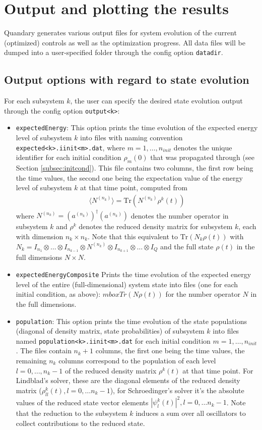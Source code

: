 \documentclass[11pt]{article}
\begin{document}
\section{Output and plotting the results}
Quandary generates various output files for system evolution of the current (optimized) controls as well as the optimization progress. All data files will be dumped into a user-specified folder through the config option \texttt{datadir}. 

\subsection{Output options with regard to state evolution}
For each subsystem $k$, the user can specify the desired state evolution output through the config option \texttt{output<k>}:
\begin{itemize}
  \item \texttt{expectedEnergy}: This option prints the time evolution of the expected energy level of subsystem $k$ into files with naming convention \texttt{expected<k>.iinit<m>.dat}, where $m=1,\dots,n_{init}$ denotes the unique identifier for each initial condition $\rho_m(0)$ that was propagated through (see Section \ref{subsec:initcond}). This file contains two columns, the first row being the time values, the second one being the expectation value of the energy level of subsystem $k$ at that time point, computed from 
  \begin{align}
    \langle N^{(n_k)}\rangle = \mbox{Tr}\left(N^{(n_k)} \rho^k(t)\right)
  \end{align}
  where $N^{(n_k)} = \left(a^{(n_k)}\right)^\dagger \left(a^{(n_k)}\right)$ denotes the number operator in subsystem $k$ and $\rho^k$ denotes the reduced density matrix for subsystem $k$, each with dimension $n_k\times n_k$. Note that this equivalent to $\mbox{Tr}\left(N_k \rho(t)\right)$ with $N_k = I_{n_1} \otimes \dots \otimes I_{n_{k-1}} \otimes N^{(n_k)} \otimes I_{n_{k+1}}\otimes \dots \otimes I_Q$ and the full state $\rho(t)$ in the full dimensions $N\times N$.
  \item \texttt{expectedEnergyComposite} Prints the time evolution of the expected energy level of the entire (full-dimensional) system state into files (one for each initial condition, as above): $mbox{Tr}\left(N \rho(t)\right)$ for the number operator $N$ in the full dimensions. 
  \item \texttt{population}: This option prints the time evolution of the state populations (diagonal of density matrix, state probabilities) of subsystem $k$ into files named \texttt{population<k>.iinit<m>.dat} for each initial condition $m=1,\dots, n_{init}$. The files contain $n_k+1$ columns, the first one being the time values, the remaining $n_k$ columns correspond to the population of each level $l=0,\dots,n_k-1$ of the reduced density matrix $\rho^k(t)$ at that time point. For Lindblad's solver, these are the diagonal elements of the reduced density matrix ($\rho_{ll}^k(t), l=0,\dots n_k-1$), for Schroedinger's solver it's the absolute values of the reduced state vector elements $|\psi^k_l(t)|^2, l=0,\dots n_k-1$. Note that the reduction to the subsystem $k$ induces a sum over all oscillators to collect contributions to the reduced state. 

\end{itemize}
\end{document}
